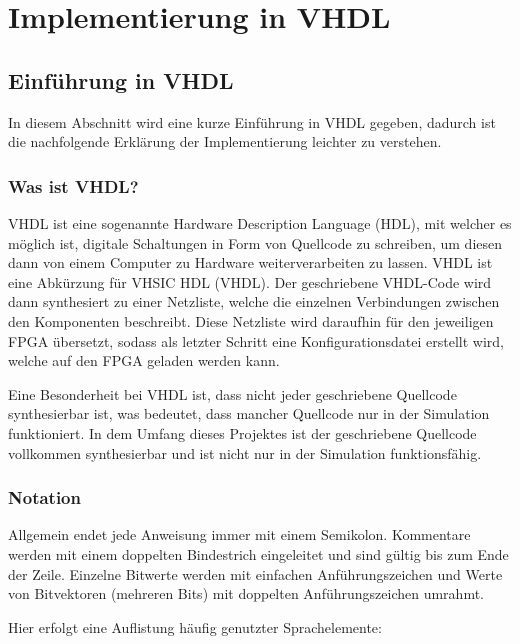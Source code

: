 \chapter{Implementierung in VHDL}
\label{c:vhdl}
\section{Einführung in VHDL}
In diesem Abschnitt wird eine kurze Einführung in VHDL gegeben, dadurch ist die
nachfolgende Erklärung der Implementierung leichter zu verstehen.

\subsection{Was ist VHDL?}
VHDL ist eine sogenannte Hardware Description Language (HDL), mit welcher es
möglich ist, digitale Schaltungen in Form von Quellcode zu schreiben, um diesen
dann von einem Computer zu Hardware weiterverarbeiten zu lassen. VHDL ist eine
Abkürzung für VHSIC HDL (\acl{VHDL}). Der geschriebene VHDL-Code wird dann
synthesiert zu einer Netzliste, welche die einzelnen Verbindungen zwischen den
Komponenten beschreibt. Diese Netzliste wird daraufhin für den jeweiligen
\ac{FPGA} übersetzt, sodass als letzter Schritt eine Konfigurationsdatei
erstellt wird, welche auf den \ac{FPGA} geladen werden kann.

Eine Besonderheit bei VHDL ist, dass nicht jeder geschriebene Quellcode
synthesierbar ist, was bedeutet, dass mancher Quellcode nur in der Simulation
funktioniert. In dem Umfang dieses Projektes ist der geschriebene Quellcode
vollkommen synthesierbar und ist nicht nur in der Simulation funktionsfähig.

\subsection{Notation}
Allgemein endet jede Anweisung immer mit einem Semikolon. Kommentare werden mit
einem doppelten Bindestrich eingeleitet und sind gültig bis zum Ende der
Zeile. Einzelne Bitwerte werden mit einfachen Anführungszeichen und Werte
von Bitvektoren (mehreren Bits) mit doppelten Anführungszeichen umrahmt.

Hier erfolgt eine Auflistung häufig genutzter Sprachelemente:

